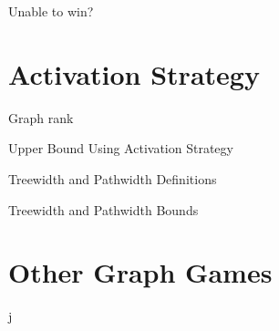 \documentclass{beamer}
\begin{document}

\begin{frame}{\secname}{Unable to win?}
    
    
\end{frame}


\section{Activation Strategy}


\begin{frame}{\secname}
\end{frame}


\begin{frame}{\secname}{Graph rank}
    
\end{frame}



\begin{frame}{\secname}{Upper Bound Using Activation Strategy}
\end{frame}


\begin{frame}{\secname}{Treewidth and Pathwidth Definitions}
    
\end{frame}


\begin{frame}{\secname}{Treewidth and Pathwidth Bounds}
    
\end{frame}


\section{Other Graph Games}


\begin{frame}{\secname}
    j
\end{frame}
\end{document}
